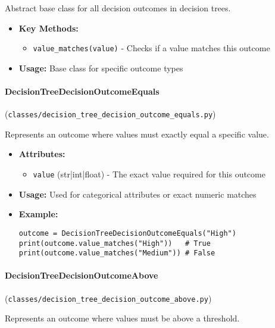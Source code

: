 \documentclass[
english,
smallborders
]{i6prcsht}
\begin{document}
Abstract base class for all decision outcomes in decision trees.

\begin{itemize}
	\item \textbf{Key Methods:}
	      \begin{itemize}
		      \item \texttt{value\_matches(value)} - Checks if a value matches this outcome
	      \end{itemize}
	\item \textbf{Usage:} Base class for specific outcome types
\end{itemize}

\vspace*{0.3cm}

\paragraph{DecisionTreeDecisionOutcomeEquals} (\texttt{classes/decision\_tree\_decision\_outcome\_equals.py})

Represents an outcome where values must exactly equal a specific value.

\begin{itemize}
	\item \textbf{Attributes:}
	      \begin{itemize}
		      \item \texttt{value} (str|int|float) - The exact value required for this outcome
	      \end{itemize}
	\item \textbf{Usage:} Used for categorical attributes or exact numeric matches
	\item \textbf{Example:}
	      \begin{lstlisting}
outcome = DecisionTreeDecisionOutcomeEquals("High")
print(outcome.value_matches("High"))   # True
print(outcome.value_matches("Medium")) # False
    \end{lstlisting}
\end{itemize}

\vspace*{0.3cm}

\paragraph{DecisionTreeDecisionOutcomeAbove} (\texttt{classes/decision\_tree\_decision\_outcome\_above.py})

Represents an outcome where values must be above a threshold.
\end{document}

